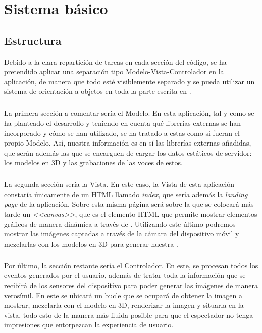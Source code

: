 \documentclass{subfiles}
\begin{document}
  \chapter{Sistema básico}
  \label{chap:2}

        \section{Estructura}
        \label{sec:2.1}
        Debido a la clara repartición de tareas en cada sección del código, se ha pretendido aplicar una separación tipo Modelo-Vista-Controlador en la aplicación, de manera que todo esté visiblemente separado y se pueda utilizar un sistema de orientación a objetos en toda la parte escrita en \js.

        \paragraph{}
        La primera sección a comentar sería el Modelo. En esta aplicación, tal y como se ha planteado el desarrollo y teniendo en cuenta qué librerías externas se han incorporado y cómo se han utilizado, se ha tratado a estas como si fueran el propio Modelo. Así, nuestra información es en sí las librerías externas añadidas, que serán además las que se encarguen de cargar los datos estáticos de servidor: los modelos en 3D y las grabaciones de las voces de estos.

        \paragraph{}
        La segunda sección sería la Vista. En este caso, la Vista de esta aplicación constaría únicamente de un HTML llamado \textit{index}, que sería además la \textit{landing page} de la aplicación. Sobre esta misma página será sobre la que se colocará más tarde un \textit{<<canvas>>}, que es el elemento HTML que permite mostrar elementos gráficos de manera dinámica a través de \js. Utilizando este último podremos mostrar las imágenes captadas a través de la cámara del dispositivo móvil y mezclarlas con los modelos en 3D para generar nuestra \ra.

        \paragraph{}
        Por último, la sección restante sería el Controlador. En este, se procesan todos los eventos generados por el usuario, además de tratar toda la información que se recibirá de los sensores del dispositivo para poder generar las imágenes de manera verosímil. En este se ubicará un bucle que se ocupará de obtener la imagen a mostrar, mezclarla con el modelo en 3D, renderizar la imagen y situarla en la vista, todo esto de la manera más fluida posible para que el espectador no tenga impresiones que entorpezcan la experiencia de usuario.
\end{document}
